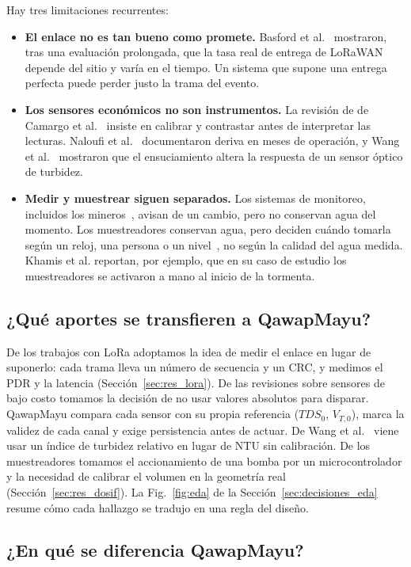 Hay tres limitaciones recurrentes:
\begin{itemize}
    \item \textbf{El enlace no es tan bueno como promete.} Basford et al.~\cite{basford} mostraron, tras una evaluación prolongada, que la tasa real de entrega de LoRaWAN depende del sitio y varía en el tiempo. Un sistema que supone una entrega perfecta puede perder justo la trama del evento.
    \item \textbf{Los sensores económicos no son instrumentos.} La revisión de de Camargo et al.~\cite{camargo} insiste en calibrar y contrastar antes de interpretar las lecturas. Naloufi et al.~\cite{naloufi} documentaron deriva en meses de operación, y Wang et al.~\cite{wang} mostraron que el ensuciamiento altera la respuesta de un sensor óptico de turbidez.
    \item \textbf{Medir y muestrear siguen separados.} Los sistemas de monitoreo, incluidos los mineros~\cite{bo2022,yasutaka2024}, avisan de un cambio, pero no conservan agua del momento. Los muestreadores conservan agua, pero deciden cuándo tomarla según un reloj, una persona o un nivel~\cite{khamis2023,neumann2023}, no según la calidad del agua medida. Khamis et al. reportan, por ejemplo, que en su caso de estudio los muestreadores se activaron a mano al inicio de la tormenta.
\end{itemize}

\subsection{¿Qué aportes se transfieren a QawapMayu?}

De los trabajos con LoRa adoptamos la idea de medir el enlace en lugar de suponerlo: cada trama lleva un número de secuencia y un CRC, y medimos el PDR y la latencia (Sección~\ref{sec:res_lora}). De las revisiones sobre sensores de bajo costo tomamos la decisión de no usar valores absolutos para disparar. QawapMayu compara cada sensor con su propia referencia ($TDS_0$, $V_{T,0}$), marca la validez de cada canal y exige persistencia antes de actuar. De Wang et al.~\cite{wang} viene usar un índice de turbidez relativo en lugar de NTU sin calibración. De los muestreadores tomamos el accionamiento de una bomba por un microcontrolador y la necesidad de calibrar el volumen en la geometría real (Sección~\ref{sec:res_dosif}). La Fig.~\ref{fig:eda} de la Sección~\ref{sec:decisiones_eda} resume cómo cada hallazgo se tradujo en una regla del diseño.

\subsection{¿En qué se diferencia QawapMayu?}

